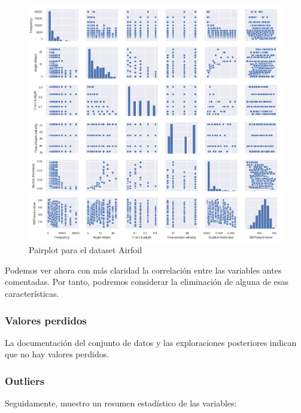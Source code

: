 \begin{figure}[H] %
	\centering
	\includegraphics[scale=0.6]{pairplot-air.png}  %
	\caption{Pairplot para el dataset Airfoil} 
	\label{fig:pairplot-air}
\end{figure}

Podemos ver ahora con más claridad la correlación entre las variables antes comentadas. Por tanto, podremos considerar la eliminación de alguna de esas características.


\subsubsection{Valores perdidos}

La documentación del conjunto de datos y las exploraciones posteriores indican que no hay valores perdidos.
\newpage
\subsubsection{Outliers}

Seguidamente, muestro un resumen estadístico de las variables:

